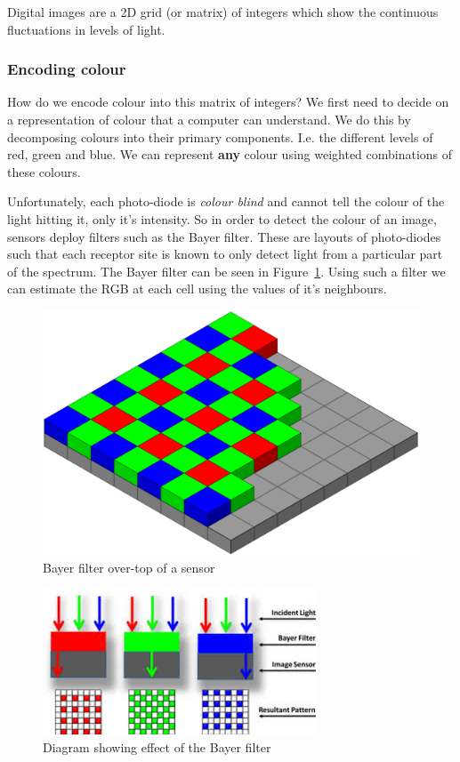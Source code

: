 \documentclass{article}
\begin{document}
Digital images are a 2D grid (or matrix) of integers which show the continuous fluctuations in levels of light.

\subsubsection{Encoding colour}

How do we encode colour into this matrix of integers? We first need to decide on a representation of colour that a computer can understand. We do this by decomposing colours into their primary components. I.e. the different levels of red, green and blue. We can represent \textbf{any} colour using weighted combinations of these colours.

Unfortunately, each photo-diode is \textit{colour blind} and cannot tell the colour of the light hitting it, only it's intensity. So in order to detect the colour of an image, sensors deploy filters such as the Bayer filter. These are layouts of photo-diodes such that each receptor site is known to only detect light from a particular part of the spectrum. The Bayer filter can be seen in Figure~\ref{fig:bayer1}. Using such a filter we can estimate the RGB at each cell using the values of it's neighbours.

\begin{figure}[ht]
  \centering
  \includegraphics[scale=0.1]{figures/bayer1.png}
  \caption{\label{fig:bayer1} Bayer filter over-top of a sensor}
\end{figure}

\begin{figure}[ht]
  \centering
  \includegraphics[scale=0.5]{figures/bayer2.jpeg}
  \caption{\label{fig:bayer2} Diagram showing effect of the Bayer filter}
\end{figure}
\end{document}
